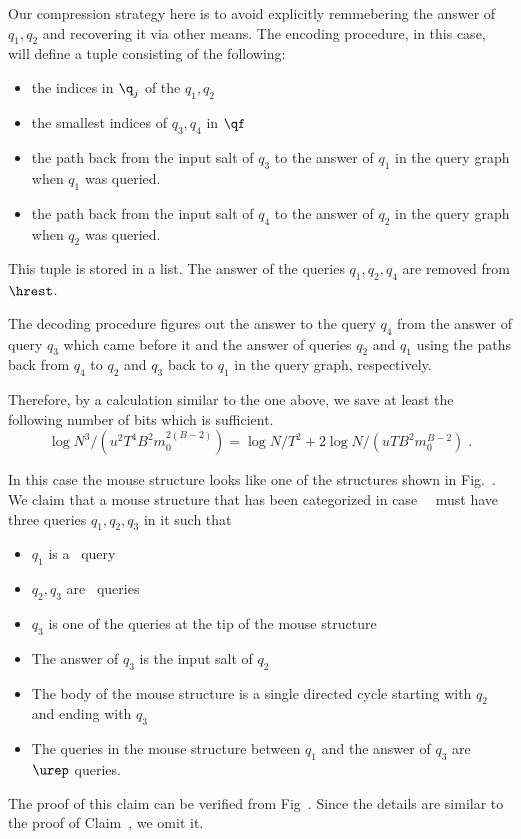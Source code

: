 {Our compression strategy here is to avoid explicitly remmebering the answer of $q_1,q_2$ and recovering it via other means.
The encoding procedure, in this case, will define a tuple consisting of the following:
\begin{itemize}
\item the indices in $\q_j$ of the $q_1,q_2$
\item the smallest indices of $q_3,q_4$ in $\qf$
\item the path back from the input salt of $q_3$ to the answer of $q_1$ in the query graph when $q_1$ was queried. 
\item the path back from the input salt of $q_4$ to the answer of $q_2$ in the query graph when $q_2$ was queried. 
\end{itemize}
This tuple is stored in a list. The answer of the queries $q_1,q_2,q_4$ are removed from $\hrest$.

The decoding procedure figures out the answer to the query $q_4$ from the answer of query $q_3$ which came before it and the answer of queries $q_2$ and $q_1$ using the paths back from $q_4$ to $q_2$ and $q_3$ back to $q_1$ in the query graph, respectively.

Therefore, by a calculation similar to the one above, we save at least the following number of bits which is sufficient. $$\log N^3/(u^2T^4B^2m_0^{2(B-2)})=\log N/T^2+2\log N/(uTB^2m_0^{B-2})\;.$$


In this case the mouse structure looks like one of the structures shown in Fig.~. We claim that a mouse structure that has been categorized in case~~ must have three queries $q_1,q_2,q_3$ in it such that
\begin{itemize}
\item $q_1$ is a \new\ query
\item $q_2,q_3$ are \urep\ queries
\item $q_3$ is one of the queries at the tip of the mouse structure
\item The answer of $q_3$ is the input salt of $q_2$
\item The body of the mouse structure is a single directed cycle starting with $q_2$ and ending with $q_3$
\item The queries in the mouse structure between $q_1$ and the answer of $q_3$ are $\urep$ queries.
\end{itemize}
The proof of this claim can be verified from Fig~. Since the details are similar to the proof of Claim~, we omit it.

}
